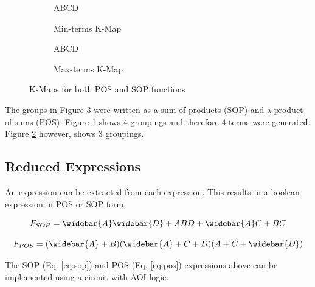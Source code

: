 \documentclass[CMPE]{KGCOEReport}
\begin{document}
\begin{figure}[h!]
	\begin{subfigure}{.5\textwidth}
		\centering
		\begin{Karnaugh}{AB}{CD}
		\end{Karnaugh}
		\caption{Min-terms K-Map}
		\label{fig:sop}
	\end{subfigure}
	\begin{subfigure}{.5\textwidth}
		\centering
		\begin{Karnaugh}{AB}{CD}
		\end{Karnaugh}
		\caption{Max-terms K-Map}
		\label{fig:pos}
	\end{subfigure}
	
	\caption{K-Maps for both POS and SOP functions}
	\label{fig:kmap}
\end{figure}

The groups in Figure \ref{fig:kmap} were written as a sum-of-products (SOP) and a product-of-sums (POS). Figure \ref{fig:sop} shows 4 groupings and therefore 4 terms were generated. Figure \ref{fig:pos} however, shows 3 groupings.

\subsection*{Reduced Expressions}

An expression can be extracted from each expression. This results in a boolean expression in POS or SOP form.

\begin{equation}
\label{eq:sop}
F_{SOP} = \widebar{A}\widebar{D} + ABD + \widebar{A}C + BC
\end{equation}

\begin{equation}
\label{eq:pos}
F_{POS} = (\widebar{A} + B)(\widebar{A} + C + D)(A + C + \widebar{D})
\end{equation}

The SOP (Eq. \ref{eq:sop}) and POS (Eq. \ref{eq:pos}) expressions above can be implemented using a circuit with AOI logic.
\end{document}

